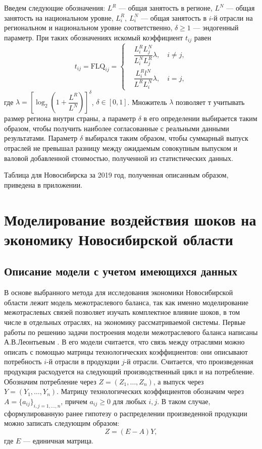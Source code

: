 \documentclass[12pt, a4paper]{article}
\begin{document}
Введем следующие обозначения: $L^R$ --- общая занятость в регионе, $L^N$ --- общая занятость на национальном уровне, $L_i^R,\ L_i^N$ --- общая занятость в $i$-й отрасли на региональном и национальном уровне соответственно, $\delta \geqslant 1$ --- эндогенный параметр. При таких обозначениях искомый коэффициент $t_{ij}$ равен
$$
t_{ij} = \mathrm{FLQ}_{ij} = \left\{\begin{aligned}
& \dfrac{L_i^R L_j^N}{L_i^N L_j^R}\lambda,\quad i \neq j,\\
& \dfrac{L_i^R l^N}{L^R L_i^N}\lambda,\quad i=j,
\end{aligned}\right.
$$
где $\lambda = \left[\log_2\left(1 + \dfrac{L^R}{L^N}\right)\right]^\delta$, $\delta \in [0, 1]$. Множитель $\lambda$ позволяет
\cite{InverseShan}т учитывать размер региона внутри страны, а параметр $\delta$ в его определении выбирается таким образом, чтобы получить наиболее согласованные с реальными данными результатами. Параметр $\delta$ выбирался таким образом, чтобы суммарный выпуск отраслей не превышал разницу между ожидаемым совокупным выпуском и валовой добавленной стоимостью, полученной из статистических данных.

Таблица для Новосибирска за 2019 год, полученная описанным образом, приведена в приложении.

\section{Моделирование воздействия шоков на экономику Новосибирской области}
\subsection{Описание модели с учетом имеющихся данных}
В основе выбранного метода для исследования экономики Новосибирской области лежит модель межотраслевого баланса, так как именно моделирование межотраслевых связей позволяет изучать комплектное влияние шоков, в том числе в отдельных отраслях, на экономику рассматриваемой системы. Первые работы по решению задачи построения модели межотраслевого баланса написаны А.В.Леонтьевым \cite{Leontief}. В его модели считается, что связь между отраслями можно описать с помощью матрицы технологических коэффициентов: они описывают потребность $i$-й отрасли в продукции $j$-й отрасли. Считается, что произведенная продукция расходуется на следующий производственный цикл и на потребление. Обозначим потребление через $Z = (Z_1, \ldots, Z_n)$, а выпуск через $Y = (Y_1, \ldots, Y_n)$. Матрицу технологических коэффициентов обозначим через $A = \{a_{ij}\}_{i,j = 1, \ldots, n}$, причем $a_{ij} \geqslant 0$ для любых $i, j$. В таком случае, сформулированную ранее гипотезу о распределении произведенной продукции можно записать следующим образом:
$$
Z = (E - A)Y,
$$
где $E$ --- единичная матрица.
\end{document}
